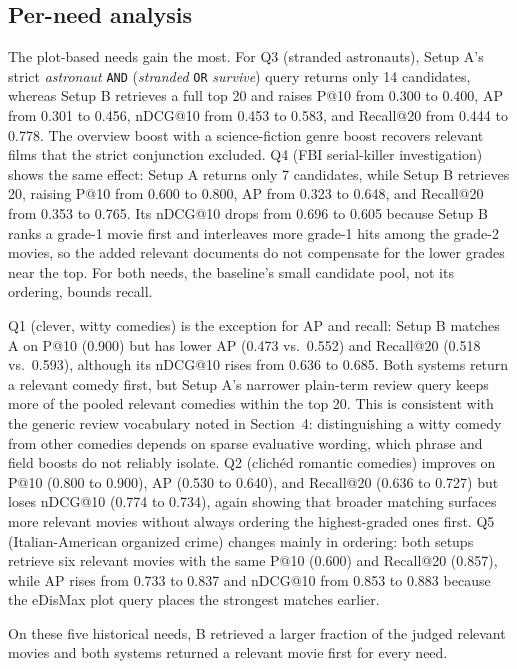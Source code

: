 \documentclass[sigconf]{acmart}
\begin{document}
\subsection{Per-need analysis}
The plot-based needs gain the most. For Q3 (stranded astronauts), Setup A's strict
\textit{astronaut} \texttt{AND} (\textit{stranded} \texttt{OR} \textit{survive})
query returns only 14 candidates, whereas Setup B retrieves a full top 20 and raises
P@10 from 0.300 to 0.400, AP from 0.301 to 0.456, nDCG@10 from 0.453 to 0.583, and
Recall@20 from 0.444 to 0.778. The overview boost with a science-fiction genre boost
recovers relevant films that the strict conjunction excluded. Q4 (FBI serial-killer
investigation) shows the same effect: Setup A returns only 7 candidates, while Setup
B retrieves 20, raising P@10 from 0.600 to 0.800, AP from 0.323 to 0.648, and
Recall@20 from 0.353 to 0.765. Its nDCG@10 drops from 0.696 to 0.605 because Setup B
ranks a grade-1 movie first and interleaves more grade-1 hits among the grade-2
movies, so the added relevant documents do not compensate for the lower grades near
the top. For both needs, the baseline's small candidate pool, not its ordering,
bounds recall.

Q1 (clever, witty comedies) is the exception for AP and recall: Setup B matches A
on P@10 (0.900) but has lower AP (0.473 vs.\ 0.552) and Recall@20 (0.518 vs.\
0.593), although its nDCG@10 rises from 0.636 to 0.685. Both systems return
a relevant comedy first, but Setup A's narrower plain-term review query keeps more of
the pooled relevant comedies within the top 20. This is consistent with the generic
review vocabulary noted in Section~4: distinguishing a witty comedy from other
comedies depends on sparse evaluative wording, which phrase and field boosts do not
reliably isolate. Q2 (clich\'ed romantic comedies) improves on P@10 (0.800 to 0.900),
AP (0.530 to 0.640), and Recall@20 (0.636 to 0.727) but loses nDCG@10 (0.774 to
0.734), again showing that broader matching surfaces more relevant movies without
always ordering the highest-graded ones first. Q5 (Italian-American organized crime)
changes mainly in ordering: both setups retrieve six relevant movies with the same
P@10 (0.600) and Recall@20 (0.857), while AP rises from 0.733 to 0.837 and nDCG@10
from 0.853 to 0.883 because the eDisMax plot query places the strongest matches
earlier.

On these five historical needs, B retrieved a larger fraction of the judged
relevant movies and both systems returned a relevant movie first for every need.
\end{document}
